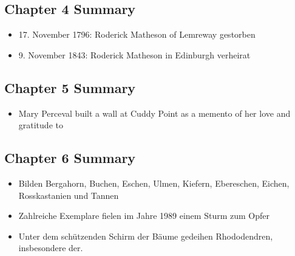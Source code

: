\documentclass[12pt]{article}
\begin{document}
\subsection*{Chapter {4} Summary}
\begin{itemize}
 Matheson of Lews in memory of my beloved father Roderick Matheson of Lemreway who died on the 17th day of November 1796/Married in Edinburgh 9th November 1843/Died in Mentone, France, 31st December 1878.

\item  17. November 1796: Roderick Matheson of Lemreway gestorben 
\item  9. November 1843: Roderick Matheson in Edinburgh verheirat\end{itemize}
\subsection*{Chapter {5} Summary}
\begin{itemize}
 bilden Kiefern und Laubbäume, während immergrüne Arten wie Chilenische Araukarie (Araucaria araucana) und Chinesische Fichte (Picea wilsonii) die Parkanlage im Winter zusätzlich schmücken.
\item  Mary Perceval built a wall at Cuddy Point as a memento of her love and gratitude to\end{itemize}
\subsection*{Chapter {6} Summary}
\begin{itemize}
 Mobile Ansicht

\item  Bilden Bergahorn, Buchen, Eschen, Ulmen, Kiefern, Ebereschen, Eichen, Rosskastanien und Tannen 
\item  Zahlreiche Exemplare fielen im Jahre 1989 einem Sturm zum Opfer
\item  Unter dem schützenden Schirm der Bäume gedeihen Rhododendren, insbesondere der.\end{itemize}
\end{document}
